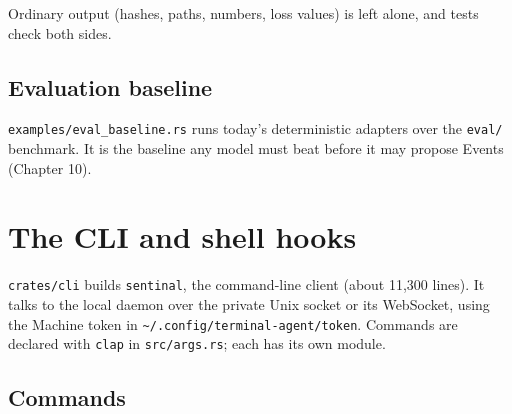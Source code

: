 Ordinary output (hashes, paths, numbers, loss values) is left alone, and tests check both sides.

\section{\texorpdfstring{Evaluation baseline}{Evaluation baseline}}

\texttt{examples/\allowbreak{}eval\_\allowbreak{}baseline.\allowbreak{}rs} runs today's deterministic adapters over the \texttt{eval/\allowbreak{}} benchmark. It is the baseline any model must beat before it may propose Events (Chapter 10).

\chapter{\texorpdfstring{The CLI and shell hooks}{The CLI and shell hooks}}

\texttt{crates/\allowbreak{}cli} builds \texttt{sentinal}, the command-line client (about 11,300 lines). It talks to the local daemon over the private Unix socket or its WebSocket, using the Machine token in \texttt{\textasciitilde{}/\allowbreak{}.\allowbreak{}config/\allowbreak{}terminal-{}\allowbreak{}agent/\allowbreak{}token}. Commands are declared with \texttt{clap} in \texttt{src/\allowbreak{}args.\allowbreak{}rs}; each has its own module.

\section{\texorpdfstring{Commands}{Commands}}

